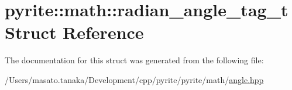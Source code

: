 \hypertarget{structpyrite_1_1math_1_1radian__angle__tag__t}{}\section{pyrite\+:\+:math\+:\+:radian\+\_\+angle\+\_\+tag\+\_\+t Struct Reference}
\label{structpyrite_1_1math_1_1radian__angle__tag__t}


The documentation for this struct was generated from the following file\+:\begin{DoxyCompactItemize}
\item 
/\+Users/masato.\+tanaka/\+Development/cpp/pyrite/pyrite/math/\mbox{\hyperlink{angle_8hpp}{angle.\+hpp}}\end{DoxyCompactItemize}
